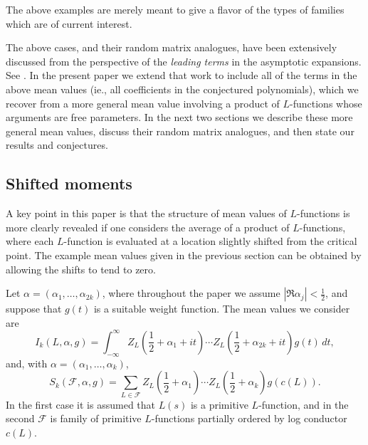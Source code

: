 \documentclass[12pt,letterpaper]{amsart}
\theoremstyle{plain}
\theoremstyle{definition}
\theoremstyle{remark}
\numberwithin{equation}{subsection}
\numberwithin{theorem}{subsection}
\numberwithin{table}{subsection}
\begin{document}
The above examples are merely meant to give a flavor of
the types of families which are  of current interest.

The above cases, and their random matrix analogues, have been
extensively discussed from the perspective of the {\it leading
terms} in the asymptotic expansions. See \cite{CF,KS1,KS2}. In the
present paper we extend that work to include all of the terms in
the above mean values (ie., all coefficients in the conjectured
polynomials), which we recover from a more general mean value
involving a product of $L$-functions whose arguments are free
parameters. In the next two sections we describe these more
general mean values, discuss their random matrix analogues, and
then state our results and conjectures.


\subsection{  Shifted moments
}\label{sec:shiftedmoments}

A key point in this paper is that the structure of mean values of
$L$-functions is more clearly revealed if one considers the average
of a product of $L$-functions, where each $L$-function is evaluated
at a location slightly shifted from the critical point.  
The example mean values given in the previous section can be obtained
by allowing the shifts to tend to zero.

 Let $\alpha=(\alpha_1,\ldots, \alpha_{2k})$, where throughout
the paper we assume
$ |\Re \alpha_j|< \frac{1}{2}$, 
 and suppose that $g(t)$ is a suitable weight function. The
mean values we consider are
\begin{equation}
I_k(L,\alpha,g)= \int_{-\infty}^\infty
        Z_L({\textstyle \frac12}+\alpha_1+it)\cdots
            Z_L({\textstyle \frac12}+\alpha_{2k}+it)g(t)\,dt ,
\end{equation}
and, with $\alpha=(\alpha_1,\ldots,\alpha_{k})$,
\begin{equation}
S_k({\mathcal F},\alpha,g)= \sum_{L\in{\mathcal F}} Z_L({\textstyle
\frac12}+\alpha_1)\cdots
                    Z_L({\textstyle \frac12}+\alpha_{k})g(c(L)) .
\end{equation}
In the first case it is assumed that $L(s)$ is a primitive $L$-function,
and in the second
$\mathcal F$ is family of primitive $L$-functions partially ordered
by log conductor $c(L)$.
\end{document}
